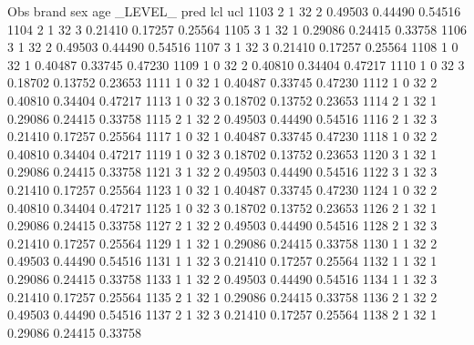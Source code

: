 \documentclass{article}
\begin{document}
\begin{Woutput}
 Obs    brand    sex    age    _LEVEL_      pred       lcl        ucl
1103      2       1      32       2       0.49503    0.44490    0.54516
1104      2       1      32       3       0.21410    0.17257    0.25564
1105      3       1      32       1       0.29086    0.24415    0.33758
1106      3       1      32       2       0.49503    0.44490    0.54516
1107      3       1      32       3       0.21410    0.17257    0.25564
1108      1       0      32       1       0.40487    0.33745    0.47230
1109      1       0      32       2       0.40810    0.34404    0.47217
1110      1       0      32       3       0.18702    0.13752    0.23653
1111      1       0      32       1       0.40487    0.33745    0.47230
1112      1       0      32       2       0.40810    0.34404    0.47217
1113      1       0      32       3       0.18702    0.13752    0.23653
1114      2       1      32       1       0.29086    0.24415    0.33758
1115      2       1      32       2       0.49503    0.44490    0.54516
1116      2       1      32       3       0.21410    0.17257    0.25564
1117      1       0      32       1       0.40487    0.33745    0.47230
1118      1       0      32       2       0.40810    0.34404    0.47217
1119      1       0      32       3       0.18702    0.13752    0.23653
1120      3       1      32       1       0.29086    0.24415    0.33758
1121      3       1      32       2       0.49503    0.44490    0.54516
1122      3       1      32       3       0.21410    0.17257    0.25564
1123      1       0      32       1       0.40487    0.33745    0.47230
1124      1       0      32       2       0.40810    0.34404    0.47217
1125      1       0      32       3       0.18702    0.13752    0.23653
1126      2       1      32       1       0.29086    0.24415    0.33758
1127      2       1      32       2       0.49503    0.44490    0.54516
1128      2       1      32       3       0.21410    0.17257    0.25564
1129      1       1      32       1       0.29086    0.24415    0.33758
1130      1       1      32       2       0.49503    0.44490    0.54516
1131      1       1      32       3       0.21410    0.17257    0.25564
1132      1       1      32       1       0.29086    0.24415    0.33758
1133      1       1      32       2       0.49503    0.44490    0.54516
1134      1       1      32       3       0.21410    0.17257    0.25564
1135      2       1      32       1       0.29086    0.24415    0.33758
1136      2       1      32       2       0.49503    0.44490    0.54516
1137      2       1      32       3       0.21410    0.17257    0.25564
1138      2       1      32       1       0.29086    0.24415    0.33758

\end{Woutput}
\end{document}
